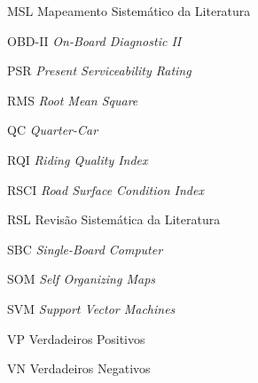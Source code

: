 \begin{siglas}
\item[MSL] Mapeamento Sistemático da Literatura
\item[OBD-II] \textit{On-Board Diagnostic II}
\item[PSR] \textit{Present Serviceability Rating}
\item[RMS] \textit{Root Mean Square}
\item[QC] \textit{Quarter-Car}
\item[RQI] \textit{Riding Quality Index}
\item[RSCI] \textit{Road Surface Condition Index}
\item[RSL] Revisão Sistemática da Literatura
\item[SBC] \textit{Single-Board  Computer}
\item[SOM] \textit{Self Organizing Maps}
\item[SVM] \textit{Support Vector Machines}
\item[VP] Verdadeiros Positivos
\item[VN] Verdadeiros Negativos
\end{siglas}
